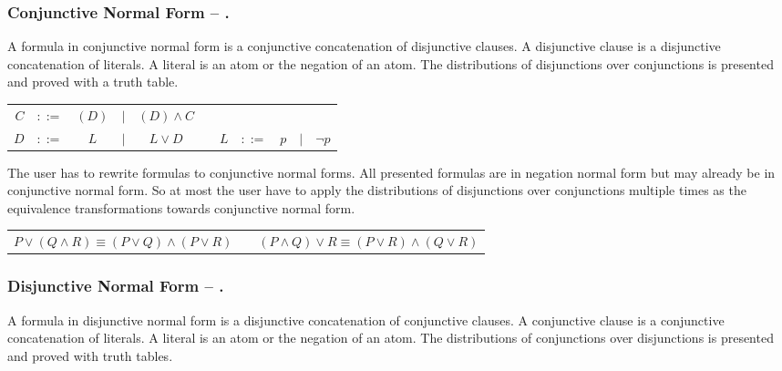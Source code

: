 \subsubsection{Conjunctive Normal Form – .}
\label{tut:43}
A formula in conjunctive normal form is a conjunctive concatenation of disjunctive clauses.
A disjunctive clause is a disjunctive concatenation of literals. 
A literal is an atom or the negation of an atom. 
The distributions of disjunctions over conjunctions is presented
and proved with a truth table.

\begin{center}
\begin{tabular}{rccccp{1cm}rcccl}
$C$	&$::=$ & $(D)$ 	&$|$ & $(D) \wedge C$ \\
$D$	&$::=$ & $L$ 	&$|$ & $L \vee D$ &&
$L$	&$::=$ & $p$ 	&$|$ & $\neg p$ 
\end{tabular}
\end{center}

The user has to rewrite formulas to conjunctive normal forms.  
All presented formulas are in negation normal form 
but may already be in conjunctive normal form.
So at most the user have to apply the distributions of disjunctions over conjunctions 
multiple times
as the equivalence transformations towards conjunctive normal form.

\begin{center}
\begin{tabular}{cp{5mm}c}
$P \vee (Q \wedge R) \equiv (P\vee Q) \wedge (P\vee R)$ & &
$(P \wedge Q) \vee R \equiv (P\vee R) \wedge (Q\vee R)$
\end{tabular}
\end{center}


\subsubsection{Disjunctive Normal Form – .}
\label{tut:44}
A formula in disjunctive normal form is a disjunctive concatenation of conjunctive clauses.
A conjunctive clause is a conjunctive concatenation of literals. 
A literal is an atom or the negation of an atom. 
The distributions of conjunctions over disjunctions is presented
and proved with truth tables.

